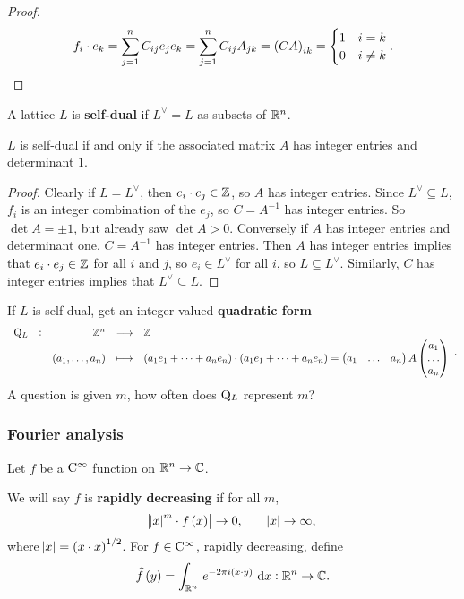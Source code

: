 \begin{proof}
$$ f_i \cdot e_k = \sum_{j = 1}^n C_{ij}e_je_k = \sum_{j = 1}^n C_{ij}A_{jk} = \br{CA}_{ik} =
\begin{cases}
1 & i = k \\
0 & i \ne k
\end{cases}.
$$
\end{proof}

\begin{definition}
A lattice $ L $ is \textbf{self-dual} if $ L^\vee = L $ as subsets of $ \mathbb{R}^n $.
\end{definition}

\begin{proposition}
$ L $ is self-dual if and only if the associated matrix $ A $ has integer entries and determinant $ 1 $.
\end{proposition}

\begin{proof}
Clearly if $ L = L^\vee $, then $ e_i \cdot e_j \in \mathbb{Z} $, so $ A $ has integer entries. Since $ L^\vee \subseteq L $, $ f_i $ is an integer combination of the $ e_j $, so $ C = A^{-1} $ has integer entries. So $ \det A = \pm 1 $, but already saw $ \det A > 0 $. Conversely if $ A $ has integer entries and determinant one, $ C = A^{-1} $ has integer entries. Then $ A $ has integer entries implies that $ e_i \cdot e_j \in \mathbb{Z} $ for all $ i $ and $ j $, so $ e_i \in L^\vee $ for all $ i $, so $ L \subseteq L^\vee $. Similarly, $ C $ has integer entries implies that $ L^\vee \subseteq L $.
\end{proof}

If $ L $ is self-dual, get an integer-valued \textbf{quadratic form}
$$ \function[\Q_L]{\ZZ^n}{\ZZ}{\br{a_1, \dots, a_n}}{\br{a_1e_1 + \dots + a_ne_n} \cdot \br{a_1e_1 + \dots + a_ne_n} = \onebythree{a_1}{\dots}{a_n}A\threebyone{a_1}{\dots}{a_n}}. $$
A question is given $ m $, how often does $ \mathrm{Q}_L $ represent $ m $?

\pagebreak

\subsubsection{Fourier analysis}


Let $ f $ be a $ \mathrm{C}^\infty $ function on $ \mathbb{R}^n \to \mathbb{C} $.

\begin{definition}
We will say $ f $ is \textbf{rapidly decreasing} if for all $ m $,
$$ \abs{\abs{x}^m \cdot f\br{x}} \to 0, \qquad \abs{x} \to \infty, $$
where $ \abs{x} = \br{x \cdot x}^{1 / 2} $. For $ f \in \mathrm{C}^\infty $, rapidly decreasing, define
$$ \widehat{f}\br{y} = \intd{\RR^n}{}{e^{-2\pi i\br{x \cdot y}}}{x} : \RR^n \to \CC. $$
\end{definition}

